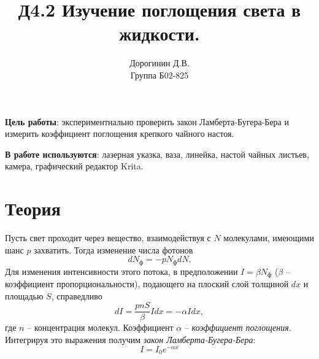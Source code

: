 \documentclass[a4paper,12pt]{article}
\author{Дорогинин Д.В.\\
Группа Б02-825}
\title{Д4.2 Изучение поглощения света в жидкости.}
\date{}
\begin{document}
\maketitle
\textbf{Цель работы}: экспериментнально проверить закон Ламберта-Бугера-Бера и измерить коэффициент поглощения крепкого чайного настоя.


\textbf{В работе используются}: лазерная указка, ваза, линейка, настой чайных листьев, камера, графический редактор Krita.
\section*{Теория}
Пусть свет проходит через вещество, взаимодействуя с $N$ молекулами, имеющими шанс $p$ захватить. Тогда изменение числа фотонов
$$
dN_{\text{ф}} = -pN_{\text{ф}} dN.
$$
Для изменения интенсивности этого потока, в предположении $I = \beta N_{\text{ф}}$ ($\beta$ -- коэффициент пропорциональности), подающего на плоский слой толщиной $dx$ и площадью $S$, справедливо 
$$
dI = \dfrac{pnS}{\beta} I dx = -\alpha I dx,
$$
где $n$ -- концентрация молекул. Коэффициент $\alpha$ -- \textit{коэффициент поглощения}. Интегрируя это выражения получим \textit{закон Ламберта-Бугера-Бера}:
\begin{equation}
I = I_0 e^{-\alpha x}
\end{equation} 
\end{document}
